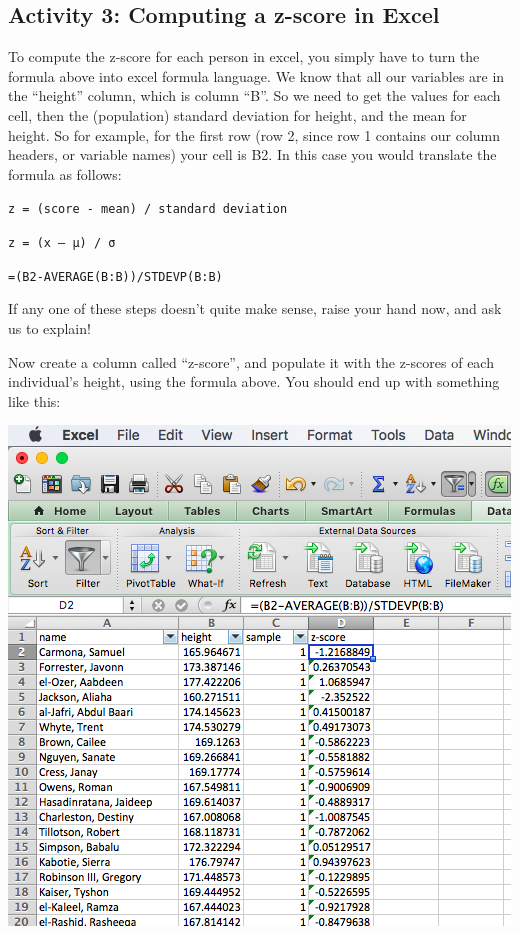 \documentclass[]{book}
\theoremstyle{definition}
\theoremstyle{definition}
\theoremstyle{definition}
\theoremstyle{remark}
\begin{document}
\hypertarget{activity-3-computing-a-z-score-in-excel}{%
\subsection{Activity 3: Computing a z-score in
Excel}\label{activity-3-computing-a-z-score-in-excel}}

To compute the z-score for each person in excel, you simply have to turn
the formula above into excel formula language. We know that all our
variables are in the ``height'' column, which is column ``B''. So we
need to get the values for each cell, then the (population) standard
deviation for height, and the mean for height. So for example, for the
first row (row 2, since row 1 contains our column headers, or variable
names) your cell is B2. In this case you would translate the formula as
follows:

\texttt{z\ =\ (score\ -\ mean)\ /\ standard\ deviation}

\texttt{z\ =\ (x\ –\ μ)\ /\ σ}

\texttt{=(B2-AVERAGE(B:B))/STDEVP(B:B)}

If any one of these steps doesn't quite make sense, raise your hand now,
and ask us to explain!

Now create a column called ``z-score'', and populate it with the
z-scores of each individual's height, using the formula above. You
should end up with something like this:

\includegraphics{imgs/z-score-col.png}
\end{document}

